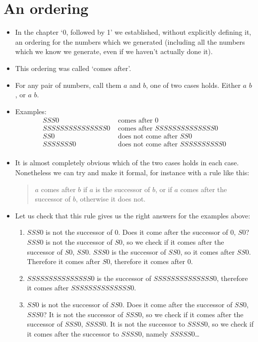 \chapter{An ordering}
\label{ordering}

\begin{itemize}
\item
In the chapter `0, followed by 1' we established, without explicitly defining it, an ordering for the numbers which we generated (including all the numbers which we know we  generate, even if we haven't actually done it).
\item
This ordering was called `comes after'. 
\item
For any pair of numbers, call them $a$ and $b$, one of two cases holds. Either $a$  $b$, or $a$  $b$.
\item
Examples:
\begin{align*}
SSS0 & \text{ comes after } 0 \\
SSSSSSSSSSSSSSS0 & \text{ comes after } SSSSSSSSSSSSSS0 \\
SS0 & \text{ does not come after } SS0 \\
SSSSSSS0 & \text{ does not come after } SSSSSSSSSS0 \\
\end{align*}
\item
It is almost completely obvious which of the two cases holds in each case. Nonetheless we can try and make it formal, for instance with a rule like this:
\begin{quote}$a$ comes after $b$ if $a$ is the successor of $b$, or if $a$ comes after the successor of $b$, otherwise it does not.
\end{quote}
\item
Let us check that this rule gives us the right answers for the examples above:
\begin{enumerate}[i]
\item
$SSS0$ is not the successor of $0$. Does it come after the successor of $0$, $S0$? $SSS0$ is not the successor of $S0$, so we check if it comes after the successor of $S0$, $SS0$. $SSS0$ is the successor of $SS0$, so it comes after $SS0$. Therefore it comes after $S0$, therefore it comes after $0$.
\item
$SSSSSSSSSSSSSSS0$ is the successor of $SSSSSSSSSSSSSS0$, therefore it comes after $SSSSSSSSSSSSSS0$.
\item
$SS0$ is not the successor of $SS0$. Does it come after the successor of $SS0$, $SSS0$? It is not the successor of $SSS0$, so we check if it comes after the successor of $SSS0$, $SSSS0$. It is not the successor to $SSSS0$, so we check if it comes after the successor to $SSSS0$, namely $SSSSS0$\ldots

\end{enumerate}
\end{itemize}
